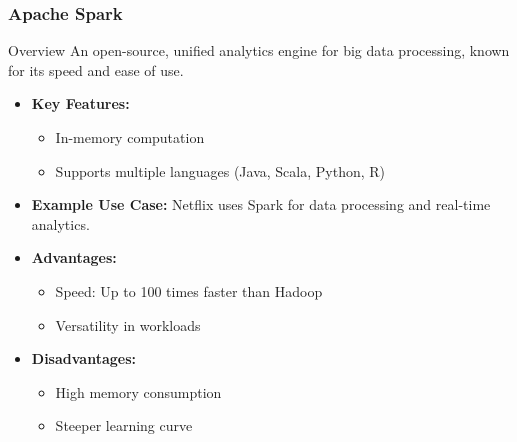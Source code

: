 \documentclass[aspectratio=169]{beamer}
\begin{document}
\begin{frame}[fragile]
    \frametitle{Apache Spark}
    \begin{block}{Overview}
        An open-source, unified analytics engine for big data processing, known for its speed and ease of use.
    \end{block}
    \begin{itemize}
        \item \textbf{Key Features:}
            \begin{itemize}
                \item In-memory computation
                \item Supports multiple languages (Java, Scala, Python, R)
            \end{itemize}
        \item \textbf{Example Use Case:}
            Netflix uses Spark for data processing and real-time analytics.
        \item \textbf{Advantages:}
            \begin{itemize}
                \item Speed: Up to 100 times faster than Hadoop
                \item Versatility in workloads
            \end{itemize}
        \item \textbf{Disadvantages:}
            \begin{itemize}
                \item High memory consumption
                \item Steeper learning curve
            \end{itemize}
    \end{itemize}
\end{frame}
\end{document}
